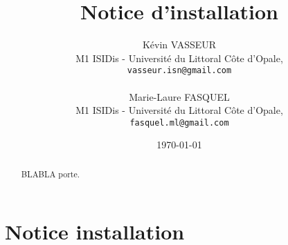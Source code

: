 \documentclass{article}
\title{Notice d'installation}
\author{K\'{e}vin VASSEUR\\
   M1 ISIDis - Universit\'{e} du Littoral C\^{o}te d'Opale,\\
   \texttt{vasseur.isn@gmail.com}\\
   \\
   Marie-Laure FASQUEL\\
   M1 ISIDis - Universit\'{e} du Littoral C\^{o}te d'Opale,\\
   \texttt{fasquel.ml@gmail.com}
}
\date{\today}
\begin{document}
	\maketitle
	\begin{abstract}
		BLABLA porte.
	\end{abstract}	
	
	\section{Notice installation}
	
\end{document}
